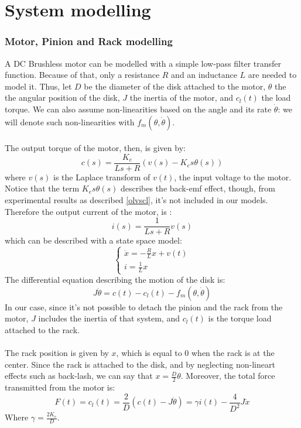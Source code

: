 
\part{System modelling}

\section{Motor, Pinion and Rack modelling} 
A DC Brushless motor can be modelled with a simple low-pass filter transfer function. Because of that, only a resistance $R$ and an inductance $L$ are needed to model it. Thus, let $D$ be the diameter of the disk attached to the motor, $\theta$ the the angular position of the disk, $J$ the inertia of the motor, and $c_{l}(t)$ the load torque. We can also assume non-linearities based on the angle and its rate $\dot{\theta}$:  we will denote such non-linearities with $f_{m}(\theta,\dot{\theta})$.\\ \\
 The output torque of the motor, then, is  given by:
$$c(s) = \frac{K_{e}}{Ls+R} (v(s)-K_{e}s \theta(s))$$
where $v(s)$ is the Laplace transform of $v(t)$, the input voltage to the motor.\\Notice that the term $K_{e}s \theta(s)$ describes the back-emf effect, though, from experimental results as described \ref{olvscl}, it's not included in our models. Therefore the output current of the motor, is :
$$i(s) = \frac{1}{Ls+R} v(s)$$
which can be described with a state space model:
$$\begin{cases} \dot{x} =-\frac{R}{L}x + v(t)\\ i = \frac{1}{L}x\end{cases}$$
The differential equation describing the motion of the disk is:
$$J\ddot{\theta}=c(t)-c_{l}(t) -f_{m}(\theta,\dot{\theta})$$
In our case, since it's not possible to detach the pinion and the rack from the motor, $J$ includes the inertia of that system, and $c_{l}(t)$ is the torque load attached to the rack. 
\\ \\
The rack position is given by $x$, which is equal to $0$ when the rack is at the center. Since the rack is attached to the disk, and by neglecting non-lineart effects such as back-lash, we can say that $x=\frac{D}{2}\theta $. Moreover,  the total force transmitted from the motor is:
$$F(t) =c_l (t) =  \frac{2}{D} (c(t)-J\ddot{\theta}) = \gamma i(t) - \frac{4}{D^2}J \ddot{x}$$
Where $\gamma = \frac{2K_e}{D}$.


